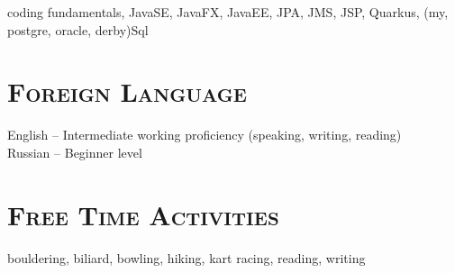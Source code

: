 \documentclass{article}
\begin{document}
coding fundamentals, JavaSE, JavaFX, JavaEE, JPA, JMS, JSP,  Quarkus, (my, postgre, oracle, derby)Sql

\section{\textsc{Foreign Language}}

English  -- Intermediate working proficiency (speaking, writing, reading)\\
Russian -- Beginner level

\section{\textsc{Free Time Activities}}

bouldering, biliard, bowling, hiking, kart racing, reading, writing
\end{document}
